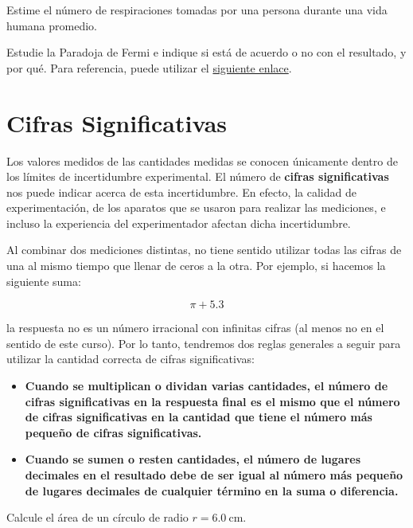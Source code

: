 \begin{ejercicio}
Estime el n\'umero de respiraciones tomadas por una persona durante una vida humana promedio.
\end{ejercicio}

\begin{ejercicio}
Estudie la Paradoja de Fermi e indique si est\'a de acuerdo o no con el resultado, y por qu\'e. Para referencia, puede utilizar el \href{https://waitbutwhy.com/2014/05/fermi-paradox.html}{siguiente enlace}.
\end{ejercicio}

\section{Cifras Significativas}\label{sec:cifras1}

Los valores medidos de las cantidades medidas se conocen \'unicamente dentro de los l\'imites de incertidumbre experimental. El n\'umero de \textbf{cifras significativas} nos puede indicar acerca de esta incertidumbre. En efecto, la calidad de experimentaci\'on, de los aparatos que se usaron para realizar las mediciones, e incluso la experiencia del experimentador afectan dicha incertidumbre.

Al combinar dos mediciones distintas, no tiene sentido utilizar todas las cifras de una al mismo tiempo que llenar de ceros a la otra. Por ejemplo, si hacemos la siguiente suma:

\[ \pi + 5.3 \]

la respuesta no es un n\'umero irracional con infinitas cifras (al menos no en el sentido de este curso). Por lo tanto, tendremos dos reglas generales a seguir para utilizar la cantidad correcta de cifras significativas:

\begin{itemize}
    \item \textbf{Cuando se multiplican o dividan varias cantidades, el n\'umero de cifras significativas en la respuesta final es el mismo que el n\'umero de cifras significativas en la cantidad que tiene el n\'umero m\'as peque\~no de cifras significativas.}
    \item \textbf{Cuando se sumen o resten cantidades, el n\'umero de lugares decimales en el resultado debe de ser igual al n\'umero m\'as peque\~no de lugares decimales de cualquier t\'ermino en la suma o diferencia.}
\end{itemize}

\begin{ejemplo}
Calcule el \'area de un c\'irculo de radio $r=\SI{6.0}{\centi\meter}$.
\end{ejemplo}

